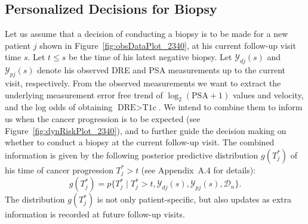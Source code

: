 \subsection{Personalized Decisions for Biopsy}
\label{subsec:pers_decision_making}
Let us assume that a decision of conducting a biopsy is to be made for a new patient $j$ shown in Figure~\ref{fig:obsDataPlot_2340}, at his current follow-up visit time $s$. Let $t\leq s$ be the time of his latest negative biopsy. Let $\mathcal{Y}_{dj}(s)$ and $\mathcal{Y}_{pj}(s)$ denote his observed DRE and PSA measurements up to the current visit, respectively. From the observed measurements we want to extract the underlying measurement error free trend of $\log_2 (\mbox{PSA} + 1)$ values and velocity, and the log odds of obtaining $\mbox{DRE} > \mbox{T1c}$. We intend to combine them to inform us when the cancer progression is to be expected (see Figure~\ref{fig:dynRiskPlot_2340}), and to further guide the decision making on whether to conduct a biopsy at the current follow-up visit. The combined information is given by the following posterior predictive distribution $g(T^*_j)$ of his time of cancer progression $T^*_j > t$ (see Appendix~A.4 for details):
\begin{equation}
\label{eq:post_pred_dist}
g(T^*_j) = p\big\{T^*_j \mid T^*_j > t, \mathcal{Y}_{dj}(s), \mathcal{Y}_{pj}(s), \mathcal{D}_n\big\}.
\end{equation}
The distribution $g(T^*_j)$ is not only patient-specific, but also updates as extra information is recorded at future follow-up visits.

